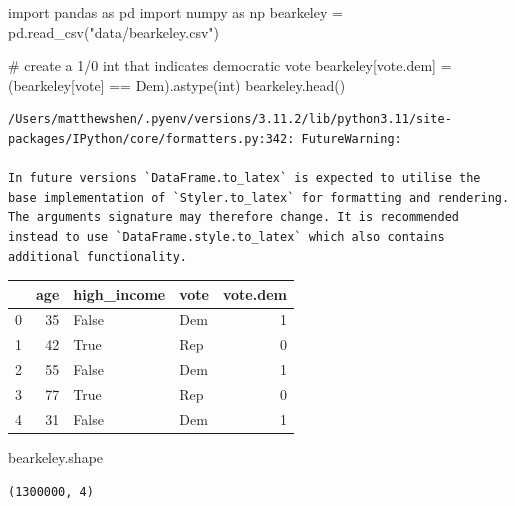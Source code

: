 \documentclass[
  letterpaper,
  DIV=11,
  numbers=noendperiod]{scrreprt}
\newenvironment{Shaded}{\begin{snugshade}}{\end{snugshade}}
\newcommand{\BuiltInTok}[1]{\textcolor[rgb]{0.00,0.23,0.31}{#1}}
\newcommand{\CommentTok}[1]{\textcolor[rgb]{0.37,0.37,0.37}{#1}}
\newcommand{\ImportTok}[1]{\textcolor[rgb]{0.00,0.46,0.62}{#1}}
\newcommand{\NormalTok}[1]{\textcolor[rgb]{0.00,0.23,0.31}{#1}}
\newcommand{\OperatorTok}[1]{\textcolor[rgb]{0.37,0.37,0.37}{#1}}
\newcommand{\StringTok}[1]{\textcolor[rgb]{0.13,0.47,0.30}{#1}}
\begin{document}
\begin{Shaded}
\begin{Highlighting}[]
\ImportTok{import}\NormalTok{ pandas }\ImportTok{as}\NormalTok{ pd}
\ImportTok{import}\NormalTok{ numpy }\ImportTok{as}\NormalTok{ np}
\NormalTok{bearkeley }\OperatorTok{=}\NormalTok{ pd.read\_csv(}\StringTok{"data/bearkeley.csv"}\NormalTok{)}

\CommentTok{\# create a 1/0 int that indicates democratic vote}
\NormalTok{bearkeley[}\StringTok{\textquotesingle{}vote.dem\textquotesingle{}}\NormalTok{] }\OperatorTok{=}\NormalTok{ (bearkeley[}\StringTok{\textquotesingle{}vote\textquotesingle{}}\NormalTok{] }\OperatorTok{==} \StringTok{\textquotesingle{}Dem\textquotesingle{}}\NormalTok{).astype(}\BuiltInTok{int}\NormalTok{)}
\NormalTok{bearkeley.head()}
\end{Highlighting}
\end{Shaded}

\begin{verbatim}
/Users/matthewshen/.pyenv/versions/3.11.2/lib/python3.11/site-packages/IPython/core/formatters.py:342: FutureWarning:

In future versions `DataFrame.to_latex` is expected to utilise the base implementation of `Styler.to_latex` for formatting and rendering. The arguments signature may therefore change. It is recommended instead to use `DataFrame.style.to_latex` which also contains additional functionality.
\end{verbatim}

\begin{tabular}{lrllr}
\toprule
{} &  age &  high\_income & vote &  vote.dem \\
\midrule
0 &   35 &        False &  Dem &         1 \\
1 &   42 &         True &  Rep &         0 \\
2 &   55 &        False &  Dem &         1 \\
3 &   77 &         True &  Rep &         0 \\
4 &   31 &        False &  Dem &         1 \\
\bottomrule
\end{tabular}

\begin{Shaded}
\begin{Highlighting}[]
\NormalTok{bearkeley.shape}
\end{Highlighting}
\end{Shaded}

\begin{verbatim}
(1300000, 4)
\end{verbatim}
\end{document}
